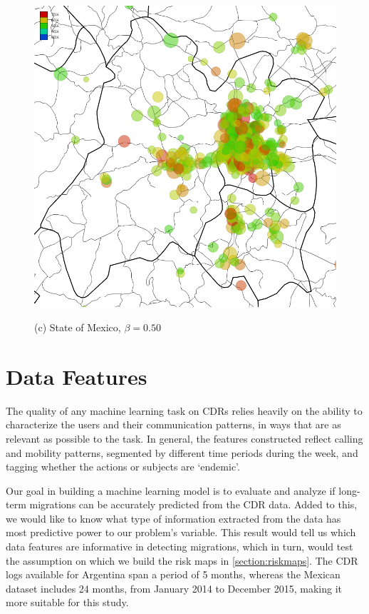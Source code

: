 \begin{figure}[p]
	\begin{minipage}{.6\linewidth}
		\centering
		\includegraphics[width=\columnwidth]
		{figures/estado_mexico_usuarios_volumen_circulos_allday_beta--50_min_volume--80_mexico_/estado_mexico_usuarios_volumen_circulos_allday_beta--50_min_volume--80_mexico_}

		(c) State of Mexico, $\beta = 0.50$
	\end{minipage}
\end{figure}



\section{Data Features}

The quality of any machine learning task on CDRs relies heavily on the ability to characterize the users and their communication patterns, in ways that are as relevant as possible to the task.
In general, the features constructed reflect calling and mobility patterns, segmented by different time periods during the week, and tagging whether the actions or subjects are `endemic'.

Our goal in building a machine learning model is to evaluate and analyze if long-term migrations can be accurately predicted from the CDR data.
Added to this, we would like to know what type of information extracted from the data has most predictive power to our problem's variable.
This result would tell us which data features are informative in detecting migrations, which in turn, would test the assumption on which we build the risk maps in \cref{section:riskmaps}.
The CDR logs available for Argentina span a period of 5 months, whereas the Mexican dataset includes 24 months, from January 2014 to December 2015, making it more suitable for this study.

